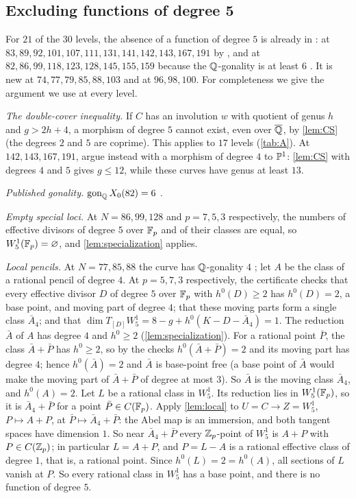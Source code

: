 \subsection{Excluding functions of degree 5}
For $21$ of the $30$ levels, the absence of a function of degree $5$ is already in \cite[\S7.2 and
Table~2]{DHJO}: at $83,89,92,101,107,111,131,141,142,143,167,191$ by \cite[Proposition~5.2]{DHJO}, and at
$82,86,99,118,123,128,145,155,159$ because the $\mathbb{Q}$-gonality is at least $6$ \cite{NajmanOrlic2024}. It is new
at $74,77,79,85,88,103$ and at $96,98,100$. For completeness we give the argument we use at every level.

\emph{The double-cover inequality.} If $C$ has an involution $w$ with quotient of genus $h$ and $g>2h+4$, a
morphism of degree $5$ cannot exist, even over $\overline{\mathbb{Q}}$, by \cref{lem:CS} (the degrees $2$ and $5$ are
coprime). This applies to $17$ levels (\cref{tab:A}). At $142,143,167,191$, \cite[Proposition~5.2]{DHJO} argue
instead with a morphism of degree $4$ to $\mathbb{P}^1$: \cref{lem:CS} with degrees $4$ and $5$ gives $g\le12$, while
these curves have genus at least $13$.

\emph{Published gonality.} $\operatorname{gon}_{\mathbb{Q}} X_0(82)=6$ \cite[Theorem~1.4]{NajmanOrlic2024}.

\emph{Empty special loci.} At $N=86,99,128$ and $p=7,5,3$ respectively, the numbers of effective divisors of
degree $5$ over $\mathbb{F}_p$ and of their classes are equal, so $W^1_5(\mathbb{F}_p)=\varnothing$, and \cref{lem:specialization}
applies.

\emph{Local pencils.} At $N=77,85,88$ the curve has $\mathbb{Q}$-gonality $4$ \cite[Theorem~1.2]{NajmanOrlic2024}; let
$A$ be the class of a rational pencil of degree $4$. At $p=5,7,3$ respectively, the certificate checks that every
effective divisor $D$ of degree $5$ over $\mathbb{F}_p$ with $h^0(D)\ge2$ has $h^0(D)=2$, a base point, and moving part of
degree $4$; that these moving parts form a single class $\bar A_4$; and that $\dim T_{[D]}W^1_5=8-g+h^0(K-D-\bar A_4)=1$.
The reduction $\bar A$ of $A$ has degree $4$ and $h^0\ge2$ (\cref{lem:specialization}). For a rational point
$\bar P$, the class $\bar A+\bar P$ has $h^0\ge2$, so by the checks $h^0(\bar A+\bar P)=2$ and its moving part has
degree $4$; hence $h^0(\bar A)=2$ and $\bar A$ is base-point free (a base point of $\bar A$ would make the moving part
of $\bar A+\bar P$ of degree at most $3$). So $\bar A$ is the moving class $\bar A_4$, and $h^0(A)=2$.
Let $L$ be a rational class in $W^1_5$. Its reduction lies in $W^1_5(\mathbb{F}_p)$, so it is $\bar A_4+\bar P$ for a point
$\bar P\in C(\mathbb{F}_p)$. Apply \cref{lem:local} to $U=C\to Z=W^1_5$, $P\mapsto A+P$, at $\bar P\mapsto\bar A_4+\bar P$: the
Abel map is an immersion, and both tangent spaces have dimension $1$. So near $\bar A_4+\bar P$ every $\mathbb{Z}_p$-point
of $W^1_5$ is $A+P$ with $P\in C(\mathbb{Z}_p)$; in particular $L=A+P$, and $P=L-A$ is a rational effective class of
degree $1$, that is, a rational point. Since $h^0(L)=2=h^0(A)$, all sections of $L$ vanish at $P$. So every rational
class in $W^1_5$ has a base point, and there is no function of degree $5$.

